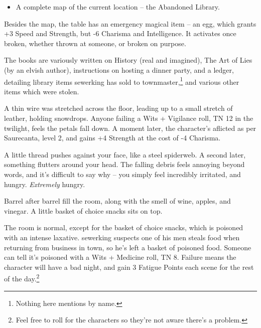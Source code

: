 \begin{multicols}{2}
\begin{itemize}
	\item{A complete map of the current location -- the Abandoned Library.}

\end{itemize}

Besides the map, the table has an emergency magical item -- an egg, which grants +3 Speed and Strength, but -6 Charisma and Intelligence.
It activates once broken, whether thrown at someone, or broken on purpose.

The books are variously written on History (real and imagined), The Art of Lies (by an elvish author), instructions on hosting a dinner party, and a ledger, detailing library items \gls{sewerking} has sold to \gls{townmaster},\footnote{Nothing here mentions  by name.} and various other items which were stolen.


A thin wire was stretched across the floor, leading up to a small stretch of leather, holding snowdrops.  Anyone failing a Wits + Vigilance roll, TN 12 in the twilight, feels the petals fall down.  A moment later, the character's aflicted as per Saurecanta, level 2, and gains +4 Strength at the cost of -4 Charisma.

\begin{boxtext}

	A little thread pushes against your face, like a steel spiderweb.
	A second later, something flutters around your head.
	The falling debris feels annoying beyond words, and it's difficult to say why -- you simply feel incredibly irritated, and hungry.
	\emph{Extremely} hungry.

\end{boxtext}


\begin{boxtext}

	Barrel after barrel fill the room, along with the smell of wine, apples, and vinegar.  A little basket of choice snacks sits on top.

\end{boxtext}

The room is normal, except for the basket of choice snacks, which is poisoned with an intense laxative.  \Gls{sewerking} suspects one of his men steals food when returning from business in town, so he's left a basket of poisoned food.  Someone can tell it's poisoned with a Wits + Medicine roll, TN 8.  Failure means the character will have a bad night, and gain 3 Fatigue Points each scene for the rest of the day.\footnote{Feel free to roll for the characters so they're not aware there's a problem.}


\end{multicols}

